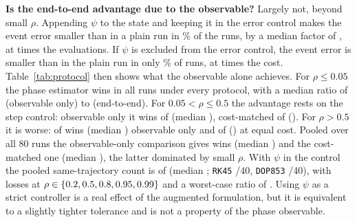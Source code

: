 \documentclass[11pt,a4paper]{article}
\begin{document}
\textbf{Is the end-to-end advantage due to the observable?} Largely not, beyond small $\rho$. Appending $\psi$ to the state and keeping it in the error control makes the event error smaller than in a plain run in \ScAugCtlSmallerPct\% of the \ScN{} runs, by a median factor of \ScMedPlainOverCtl{}, at \ScNfevCtl{} times the evaluations. If $\psi$ is excluded from the error control, the event error is smaller than in the plain run in only \ScAugFreeSmallerPct\% of runs, at \ScNfevFree{} times the cost. Table~\ref{tab:protocol} then shows what the observable alone achieves. For $\rho\le0.05$ the phase estimator wins in all \ScLowN{} runs under every protocol, with a median ratio of \ObsLowMed{} (observable only) to \EteLowMed{} (end-to-end). For $0.05<\rho\le0.5$ the advantage rests on the step control: observable only it wins \ObsMidWins{} of \ScMidN{} (median \ObsMidMed), cost-matched \CmMidWins{} of \ScMidN{} (\CmMidMed). For $\rho>0.5$ it is worse: \ObsHighWins{} of \ScHighN{} wins (median \ObsHighMed{}) observable only and \CmHighWins{} of \ScHighN{} (\CmHighMed) at equal cost. Pooled over all 80 runs the observable-only comparison gives \ObsWinsAll{} wins (median \ObsMedAll) and the cost-matched one \CmWinsAll{} (median \CmMedAll), the latter dominated by small $\rho$. With $\psi$ in the control the pooled same-trajectory count is \SameWins{} of \SameOf{} (median \SameMedRatio; \texttt{RK45} \SameWinsRK{}/40, \texttt{DOP853} \SameWinsDop{}/40), with losses at $\rho\in\{0.2, 0.5, 0.8, 0.95, 0.99\}$ and a worst-case ratio of \SameWorstRatio. Using $\psi$ as a strict controller is a real effect of the augmented formulation, but it is equivalent to a slightly tighter tolerance and is not a property of the phase observable.


\end{document}
